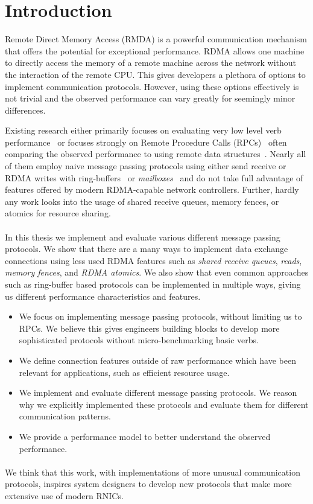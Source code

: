 \section{Introduction}

Remote Direct Memory Access (RMDA) is a powerful communication mechanism that offers the potential for exceptional performance.
RDMA allows one machine to directly access the memory of a remote machine across the network without the interaction of the 
remote CPU. This gives developers a plethora of options to implement communication protocols. However, using these options 
effectively is not trivial and the observed performance can vary greatly for seemingly minor differences. 

Existing research either primarily focuses on evaluating very low level verb performance~\cite{anuj-guide} or focuses
strongly on 
Remote Procedure Calls (RPCs)~\cite{eval-mpp} often comparing the observed performance to using remote data 
structures~\cite{fasst, rpc-vs-rdma}. Nearly all of them employ naive message passing protocols using either 
send receive or RDMA writes with ring-buffers~\cite{rdma-fast-dbms} or \emph{mailboxes}~\cite{ziegler2020rdma} and do not 
take full advantage of 
features offered by modern RDMA-capable network controllers. Further, hardly any work looks into the usage of shared receive
queues, memory fences, or atomics for resource sharing.

\paragraph{}In this thesis we implement and evaluate various different message passing protocols. We show that there are a 
many ways to implement data exchange connections using less used RDMA features such as \emph{shared receive queues}, \emph{reads}, 
\emph{memory fences}, and \emph{RDMA atomics}. We also show that even common approaches such as ring-buffer based protocols 
can be implemented in multiple ways, giving us different performance characteristics and features.

\begin{itemize}
  \item We focus on implementing message passing protocols, without limiting us to RPCs. We believe this gives engineers 
    building blocks to develop more sophisticated protocols without micro-benchmarking basic verbs.
  \item We define connection features outside of raw performance which have been relevant for applications, such as 
    efficient resource usage.
  \item We implement and evaluate different message passing protocols. We reason why we explicitly implemented these protocols
    and evaluate them for different communication patterns.
  \item We provide a performance model to better understand the observed performance.
\end{itemize}

\paragraph{}We think that this work, with 
implementations of more unusual communication protocols, inspires system designers to develop 
new protocols that make more extensive use of modern RNICs.


